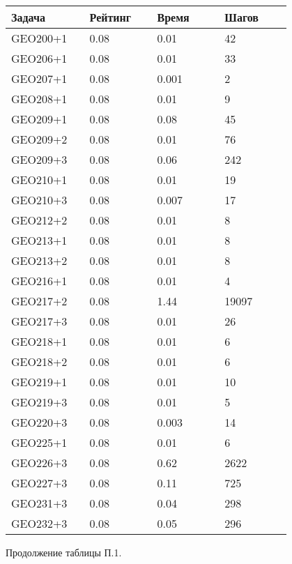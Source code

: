 \begin{longtable}[H]{|p{0.2\linewidth}|p{0.2\linewidth}|p{0.2\linewidth}|p{0.2\linewidth}|}
\hline
\textbf{Задача} & \textbf{Рейтинг} & \textbf{Время} & \textbf{Шагов} \\
\hline
GEO200+1 & 0.08 & 0.01 & 42 \\
\hline
GEO206+1 & 0.08 & 0.01 & 33 \\
\hline
GEO207+1 & 0.08 & 0.001 & 2  \\
\hline
GEO208+1 & 0.08 & 0.01 & 9 \\
\hline
GEO209+1 & 0.08 & 0.08 & 45 \\
\hline
GEO209+2 & 0.08 & 0.01 & 76 \\
\hline
GEO209+3 & 0.08 & 0.06 & 242 \\
\hline
GEO210+1 & 0.08 & 0.01 & 19 \\
\hline
GEO210+3 & 0.08 & 0.007 & 17 \\
\hline
GEO212+2 & 0.08 & 0.01 & 8 \\
\hline
GEO213+1 & 0.08 & 0.01 & 8 \\
\hline
GEO213+2 & 0.08 & 0.01 & 8 \\
\hline
GEO216+1 & 0.08 & 0.01 & 4 \\
\hline
GEO217+2 & 0.08 & 1.44 & 19097 \\
\hline
GEO217+3 & 0.08 & 0.01 & 26 \\
\hline
GEO218+1 & 0.08 & 0.01 & 6 \\
\hline
GEO218+2 & 0.08 & 0.01 & 6 \\
\hline
GEO219+1 & 0.08 & 0.01 & 10 \\
\hline
GEO219+3 & 0.08 & 0.01 & 5 \\
\hline
GEO220+3 & 0.08 & 0.003 & 14 \\
\hline
GEO225+1 & 0.08 & 0.01 & 6 \\
\hline
GEO226+3 & 0.08 & 0.62 & 2622 \\
\hline
GEO227+3 & 0.08 & 0.11 & 725 \\
\hline
GEO231+3 & 0.08 & 0.04 & 298 \\
\hline
GEO232+3 & 0.08 & 0.05 & 296 \\
\hline
\end{longtable}
\begin{center}
Продолжение таблицы П.1.
\end{center}

